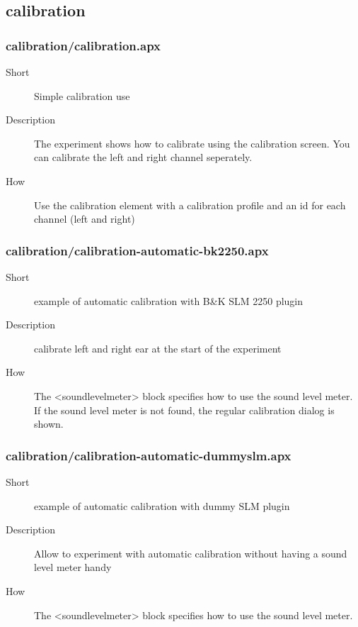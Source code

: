 \subsection{calibration}
\subsubsection{calibration/calibration.apx}
\begin{description}
\item[Short] 
 Simple calibration use
\item[Description] 
 The experiment shows how to calibrate using the calibration screen. You can calibrate the left and right channel seperately.
\item[How] 
 Use the calibration element with a calibration profile and an id for each channel (left and right)
\end{description}

\subsubsection{calibration/calibration-automatic-bk2250.apx}
\begin{description}
\item[Short] 
 example of automatic calibration with B\&K SLM 2250 plugin
\item[Description] 
 calibrate left and right ear at the start of the experiment
\item[How] 
 The \textless{}soundlevelmeter\textgreater{} block specifies how to use the sound level meter. If the sound level meter is not found, the regular calibration dialog is shown.
\end{description}

\subsubsection{calibration/calibration-automatic-dummyslm.apx}
\begin{description}
\item[Short] 
 example of automatic calibration with dummy SLM plugin
\item[Description] 
 Allow to experiment with automatic calibration without having a sound level meter handy
\item[How] 
 The \textless{}soundlevelmeter\textgreater{} block specifies how to use the sound level meter.
\end{description}

